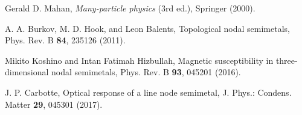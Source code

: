 \documentclass[aps,twocolumn,floatfix]{revtex4-1}
\begin{document}
\begin{thebibliography}{999}
Gerald D. Mahan, \textit{Many-particle physics} (3rd ed.), Springer (2000).

A. A. Burkov, M. D. Hook, and Leon Balents,
Topological nodal semimetals,
Phys. Rev. B {\bf 84}, 235126 (2011).

Mikito Koshino and Intan Fatimah Hizbullah,
Magnetic susceptibility in three-dimensional nodal semimetals,
Phys. Rev. B {\bf 93}, 045201 (2016).

J. P. Carbotte,
Optical response of a line node semimetal,
J. Phys.: Condens. Matter {\bf 29}, 045301 (2017).

\end{thebibliography}

\end{document}
